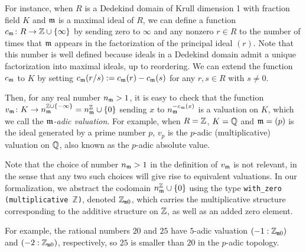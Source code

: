 \documentclass[sigplan,10pt,anonymous,review]{acmart}
\begin{document}
For instance, when $R$ is a Dedekind domain of Krull dimension 1 with fraction field $K$ and $\mathfrak{m}$ is a maximal ideal of $R$, we can define a function $c_{\mathfrak{m}} \colon R \to \mathbb{Z} \cup \{ \infty\}$  by sending zero to $\infty$ and any nonzero $r \in R$ to the number of times that $\mathfrak{m}$ appears in the factorization of the principal ideal $(r)$. Note that this number is well defined because ideals in a Dedekind domain admit a unique factorization into maximal ideals, up to reordering. We can extend the function $c_{\mathfrak{m}}$ to $K$ by setting $c_{\mathfrak{m}} (r/s) := c_{\mathfrak{m}} (r) - c_{\mathfrak{m}} (s)$ for any $r, s \in R$ with $s \ne 0$.

Then, for any real number $n_{\mathfrak{m}} > 1$, it is easy to check that the function
$ v_{\mathfrak{m}}\colon K \to n_{\mathfrak{m}}^{\mathbb{Z} \cup \{-\infty\}} = n_{\mathfrak{m}}^\mathbb{Z} \cup \{0\}$ sending $x$ to $n_{\mathfrak{m}}^{-c_{\mathfrak{m}}(x)}$ is a valuation on $K$, which we call the \textit{$\mathfrak{m}$-adic valuation}. For example, when $R = \mathbb{Z}$, $K = \mathbb{Q}$ and $\mathfrak{m} = (p)$ is the ideal generated by a prime number $p$, $v_p$ is the $p$-adic (multiplicative) valuation on $\mathbb{Q}$, also known as the $p$-adic absolute value.

Note that the choice of number $n_{\mathfrak{m}} > 1$ in the definition of $v_{\mathfrak{m}}$ is not relevant, in the sense that any two such choices will give rise to equivalent valuations. In our formalization, we abstract the codomain $n_{\mathfrak{m}}^\mathbb{Z} \cup \{0\}$ using the type
\texttt{with\_zero (multiplicative $\mathbb{Z}$)}, denoted $\mathbb{Z}_{\mathtt{m}0}$,
which carries the multiplicative structure corresponding to the additive structure on $\mathbb{Z}$, as well as an added zero element.

For example, the rational numbers $20$ and $25$ have $5$-adic valuation $(-1 : \mathbb{Z}_{\mathtt{m}0})$ and $(-2 : \mathbb{Z}_{\mathtt{m}0})$, respectively, so $25$ is smaller than $20$ in the $p$-adic topology. 
\end{document}
